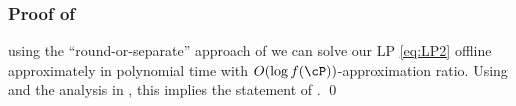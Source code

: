 	
	\subsubsection*{Proof of }
	
	using the ``round-or-separate''
	approach of \cite{gupta2020online} we can solve our LP \eqref{eq:LP2} offline approximately in polynomial time with $O(\log f(\cP))$-approximation ratio. Using   and the analysis in , this implies the statement of .  \qed